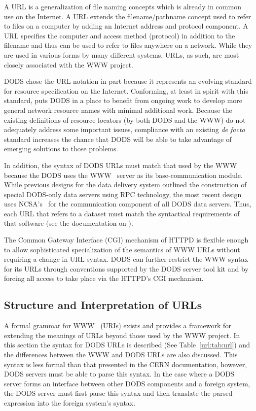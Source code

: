 A URL is a generalization of file naming concepts which is already in
common use on the Internet. A URL extends the filename/pathname
concept used to refer to files on a computer by adding an Internet
address and protocol component. A URL specifies the computer and
access method (protocol) in addition to the filename and thus can be
used to refer to files anywhere on a network. While they are used in
various forms by many different systems, URLs, as such, are most
closely associated with the WWW project.

DODS chose the URL notation in part because it represents an evolving
standard for resource specification on the Internet. Conforming, at least in
spirit with this standard, puts DODS in a place to benefit from ongoing work
to develop more general network resource names with minimal additional work.
Because the existing definitions of resource locators (by both DODS and the
WWW) do not adequately address some important issues, compliance with an
existing {\em de facto\/} standard increases the chance that DODS will be
able to take advantage of emerging solutions to those problems.

In addition, the syntax of DODS URLs must match that used by the WWW
because the DODS uses the WWW \HTTPD\ server as its base-communication
module. While previous designs for the data delivery system outlined
the construction of special DODS-only data servers using RPC
technology, the most recent design uses NCSA's \HTTPD\ for the
communication component of all DODS data servers. Thus, each URL that
refers to a dataset must match the syntactical requirements of that
software (see the documentation on \HTTP).

The Common Gateway Interface (CGI) mechanism of HTTPD is flexible enough to
allow sophisticated specialization of the semantics of WWW URLs without
requiring a change in URL syntax. DODS can further restrict the WWW syntax
for its URLs through conventions supported by the DODS server tool kit and by
forcing all access to take place via the HTTPD's CGI mechanism.

\subsection{Structure and Interpretation of URLs}
\label{url:structure}

A formal grammar for WWW \uri\ (URIs) exists and provides a framework
for extending the meanings of URLs beyond those used by the WWW
project. In this section the syntax for DODS URLs is described (See
Table~\ref{url:tab:url}) and the differences between the WWW and DODS
URLs are also discussed. This syntax is less formal than that
presented in the CERN documentation, however, DODS servers must be
able to parse this syntax. In the case where a DODS server forms an
interface between other DODS components and a foreign system, the DODS
server must first parse this syntax and then translate the parsed
expression into the foreign system's syntax.

